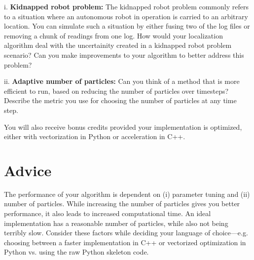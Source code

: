 \documentclass[12pt, a4paper]{article}
\begin{document}
i. \textbf{Kidnapped robot problem:} The kidnapped robot problem commonly
refers to a situation where an autonomous robot in operation is carried
to an arbitrary location. You can simulate such a situation by either
fusing two of the log files or removing a chunk of readings from one
log. How would your localization algorithm deal with the uncertainity
created in a kidnapped robot problem scenario? Can you make improvements to
your algorithm to better address this problem?

ii. \textbf{Adaptive number of particles:} Can you think of a method
that is more efficient to run, based on reducing the number of particles
over timesteps? Describe the metric you use for choosing the number
of particles at any time step.

You will also receive bonus credits provided your implementation is optimized, either with vectorization in Python or acceleration in C++.

\newpage
\section{Advice}

The performance of your algorithm is dependent on (i) parameter tuning
and (ii) number of particles. While increasing the number of particles
gives you better performance, it also leads to increased computational
time. An ideal implementation has a reasonable number of particles,
while also not being terribly slow. Consider these factors while deciding
your language of choice---e.g. choosing between a faster implementation
in C++ or vectorized optimization in Python vs. using the raw Python skeleton code.



\end{document}
